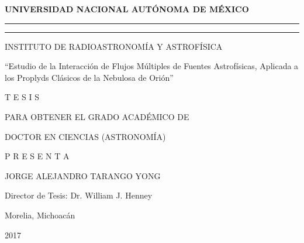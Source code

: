\centering
\textbf{UNIVERSIDAD NACIONAL AUT\'ONOMA DE M\'EXICO}

\rule{\linewidth}{0.1pt}

\rule[3mm]{0.7\linewidth}{1pt}

INSTITUTO DE RADIOASTRONOM\'IA Y ASTROF\'ISICA

``Estudio de la Interacci\'on de Flujos M\'ultiples de Fuentes Astrof\'isicas, Aplicada
a los Proplyds Cl\'asicos de la Nebulosa de Ori\'on''


T E S I S

PARA OBTENER EL GRADO ACAD\'EMICO DE

DOCTOR EN CIENCIAS (ASTRONOM\'IA)



P R E S E N T A

JORGE ALEJANDRO TARANGO YONG

Director de Tesis: Dr. William J. Henney


Morelia, Michoac\'an

2017
